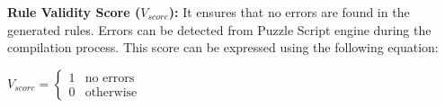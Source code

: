 \textbf{Rule Validity Score ($V_{score}$):} It ensures that no errors are found in the generated rules. Errors can be detected from Puzzle Script engine during the compilation process. This score can be expressed using the following equation:
\begin{center}
$V_{score}= \begin{cases}
               1 & \text{no errors}\\
               0 & \text{otherwise}
           \end{cases}$
\end{center}